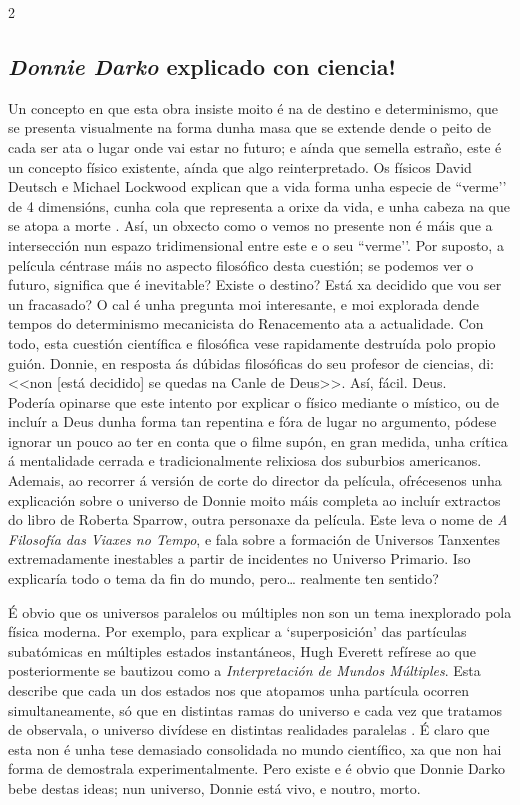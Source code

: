 \begin{multicols}{2}
\subsection*{\textit{Donnie Darko} explicado con ciencia!}

Un concepto en que esta obra insiste moito é na de destino e determinismo, que
se presenta visualmente na forma dunha masa que se extende dende o peito de
cada ser ata o lugar onde vai estar no futuro; e aínda que semella estraño,
este é un concepto físico existente, aínda que algo reinterpretado. Os físicos
David Deutsch e Michael Lockwood explican que a vida forma unha especie de
``verme’' de 4 dimensións, cunha cola que representa a orixe da vida, e unha
cabeza na que se atopa a morte \cite{deutsch.m_1994}. Así, un obxecto como
o vemos no presente non é máis que a intersección nun espazo tridimensional
entre este e o seu ``verme'’.  Por suposto, a película céntrase máis no aspecto
filosófico desta cuestión; se podemos ver o futuro, significa que é inevitable?
Existe o destino? Está xa decidido que vou ser un fracasado? O cal é unha
pregunta moi interesante, e moi explorada dende tempos do determinismo
mecanicista do Renacemento ata a actualidade. Con todo, esta cuestión
científica e filosófica vese rapidamente destruída polo propio guión. Donnie,
en resposta ás dúbidas filosóficas do seu profesor de ciencias, di: <<non [está
decidido] se quedas na Canle de Deus>>\cite{donnie_darko}.
Así, fácil. Deus.\\

Podería opinarse que este intento por explicar o físico mediante o místico, ou
de incluír a Deus dunha forma tan repentina e fóra de lugar no argumento,
pódese ignorar un pouco ao ter en conta que o filme supón, en gran medida,
unha crítica á mentalidade cerrada e tradicionalmente relixiosa dos suburbios
americanos. Ademais, ao recorrer á versión de corte do director da película,
ofrécesenos unha explicación sobre o universo de Donnie moito máis completa ao
incluír extractos do libro de Roberta Sparrow, outra personaxe da película.
Este leva o nome de \textit{A Filosofía das Viaxes no Tempo}, e fala sobre a
formación de Universos Tanxentes extremadamente inestables a partir de
incidentes no Universo Primario. Iso explicaría todo o tema da fin do mundo,
pero… realmente ten sentido?

É obvio que os universos paralelos ou múltiples non son un tema inexplorado
pola física moderna. Por exemplo, para explicar a `superposición’ das
partículas subatómicas en múltiples estados instantáneos, Hugh Everett refírese
ao que posteriormente se bautizou como a \textit{Interpretación de Mundos
Múltiples}. Esta describe que cada un dos estados nos que atopamos unha
partícula ocorren simultaneamente, só que en distintas ramas do universo e cada
vez que tratamos de observala, o universo divídese en distintas realidades
paralelas \cite{gribbin2004historia}. É claro que esta non é unha tese demasiado
consolidada no mundo científico, xa que non hai forma de demostrala
experimentalmente. Pero existe e é obvio que Donnie Darko bebe destas ideas;
nun universo, Donnie está vivo, e noutro, morto.


\end{multicols}
